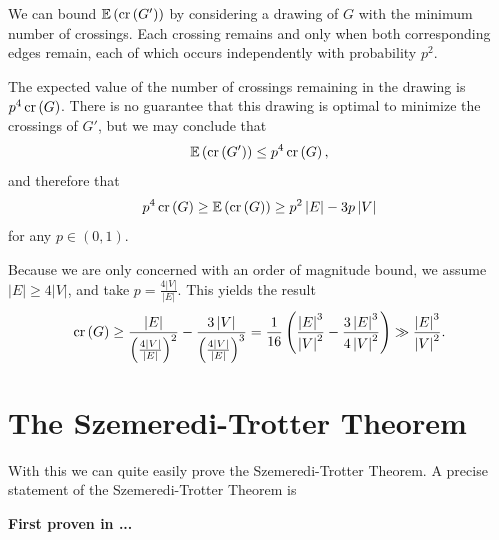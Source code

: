 \documentclass[12pt]{amsart}
\begin{document}
We can bound \(\mathbb{E} \left( \operatorname{cr}\left( G' \right)  \right) \) by considering a drawing of \(G\) with the minimum number of crossings. 
Each crossing remains and only when both corresponding edges remain, each of which occurs independently with probability
\(p^{2}\).

The expected value of the number of crossings remaining in the drawing is \(p^{4} \operatorname{cr}\left( G \right) \).
There is no guarantee that this drawing is optimal to minimize the crossings of \(G'\), but we may conclude that
\[
    \mathbb{E} \left( \operatorname{cr}\left( G' \right)  \right) \leq p ^{4} \operatorname{cr}\left( G \right)
,\]
and therefore that
\[
    p^{4} \operatorname{cr}\left( G \right) \geq \mathbb{E} \left( \operatorname{cr}\left( G \right)  \right) \geq p^{2} \left\lvert E \right\rvert - 3 p \left\lvert V \right\rvert 
\]
for any \(p \in (0,1)\). 


Because we are only concerned with an order of magnitude bound, we assume \(\left\lvert E \right\rvert \geq 4\left\lvert V \right\rvert \), and take \(p = \frac{4\left\lvert V \right\rvert }{\left\lvert E \right\rvert }\).
This yields the result
\[
    \operatorname{cr}\left( G \right) \geq \frac{\left\lvert E \right\rvert }{\left( \frac{4 \left\lvert V \right\rvert }{\left\lvert E \right\rvert }   \right)^{2} } - \frac{3 \left\lvert V \right\rvert }{\left( \frac{4 \left\lvert V \right\rvert }{\left\lvert E \right\rvert }  \right) ^{3} } = \frac{1}{16} \left( \frac{\left\lvert E \right\rvert ^{3} }{\left\lvert V \right\rvert ^{2}} - \frac{3 \left\lvert E \right\rvert ^{3} }{4 \left\lvert V \right\rvert ^{2}}  \right) \gg \frac{\left\lvert E \right\rvert ^{3} }{\left\lvert V \right\rvert ^{2}}
.\]

\section{The Szemeredi-Trotter Theorem}

With this we can quite easily prove the Szemeredi-Trotter Theorem.
A precise statement of the Szemeredi-Trotter Theorem is

\textbf{First proven in ...}
\end{document}

